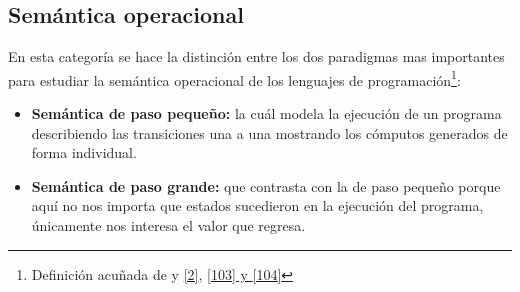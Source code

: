 \subsection{Semántica operacional}
    En esta categoría se hace la distinción entre los dos paradigmas mas importantes para estudiar la semántica operacional de los lenguajes de programación\footnote{Definición acuñada de y  \hyperlink{2}{[2]}, \hyperlink{103}{[103] y  \hyperlink{104}{[104]}} }:
    \begin{itemize}
        \item \textbf{Semántica de paso pequeño:} la cuál modela la ejecución de un programa describiendo las transiciones una a una mostrando los cómputos generados de forma individual. 
        \item \textbf{Semántica de paso grande:} que contrasta con la de paso pequeño porque aquí no nos importa que estados sucedieron en la ejecución del programa, únicamente nos interesa el valor que regresa.
    \end{itemize}
    
